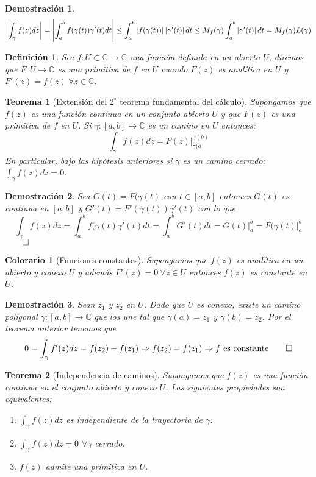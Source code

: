 \documentclass[10pt]{book}
\newtheorem{defi}{Definición}[chapter]
\newtheorem{theorem}{Teorema}[chapter]
\newtheorem*{dem}{Demostración}
\newtheorem{col}{Colorario}[chapter]
\newcommand{\C}{\mathbb{C}}
\newcommand{\f}{f: U\subset \C \longrightarrow \C}
\begin{document}
\begin{dem}
$$\left| \int_\gamma f(z)dz \right| = \left| \int_a^b f(\gamma(t))\gamma'(t)dt\right|\leq \int_a^b \left| f(\gamma(t))\right|\left| \gamma'(t)\right|dt\leq M_f(\gamma)\int_a^b\left| \gamma'(t)\right|dt =  M_f(\gamma)L(\gamma)$$
\end{dem}

\begin{defi}
Sea $\f$ una función definida en un abierto $U$, diremos que $F: U \longrightarrow\C$ es una primitiva de $f$ en $U$ cuando $F(z)$ es analítica en $U$ y $F'(z) = f(z) \ \forall z \in\C$.
\end{defi}

\begin{theorem}[Extensión del $2^\circ$ teorema fundamental del cálculo]
Supongamos que $f(z)$ es una función continua en un conjunto abierto $U$ y que $F(z)$ es una primitiva de $f$ en $U$. Si $\gamma:[a,b]\longrightarrow \C$ es un camino en $U$ entonces:
$$\int_\gamma f(z)dz = F(z)\bigg|_{\gamma(a}^{\gamma(b)}$$
En particular, bajo las hipótesis anteriores si $\gamma$ es un camino cerrado: $\int_\gamma f(z)dz = 0$.
\end{theorem}

\begin{dem}
Sea $G(t) = F(\gamma(t)$ con $t\in [a,b]$ entonces $G(t)$ es continua en $[a,b]$ y $G'(t) = F'(\gamma(t))\gamma'(t)$ con lo que
$$\int_\gamma f(z)dz = \int_a^b f(\gamma(t)\gamma'(t)dt = \int_a^b G'(t)dt = G(t)\bigg|_a^b = F(\gamma(t)\bigg |_a^b $$ $\qed$
\end{dem}

\begin{col}[Funciones constantes]
Supongamos que $f(z)$ es analítica en un abierto y conexo $U$ y además $F'(z)=0 \ \forall z \in U$ entonces $f(z)$ es constante en $U$.
\end{col}

\begin{dem}
Sean $z_1$ y $z_2$ en $U$. Dado que $U$ es conexo, existe un camino poligonal $\gamma:[a,b] \longrightarrow \C$ que los une tal que $\gamma(a) = z_1$ y $\gamma(b) = z_2$. Por el teorema anterior tenemos que
$$0 = \int_{\gamma} f'(z)dz = f(z_2)-f(z_1) \Rightarrow f(z_2)=f(z_1) \Rightarrow f \text{ es constante} \qed$$
\end{dem}


\begin{theorem}[Independencia de caminos]
Supongamos que $f(z)$ es una función continua en el conjunto abierto y conexo $U$. Las siguientes propiedades son equivalentes:
\begin{enumerate}
\item $\displaystyle\int_{\gamma}f(z)dz$ es independiente de la trayectoria de $\gamma$.
\item  $\displaystyle\int_{\gamma}f(z)dz = 0$ $\forall \gamma$ cerrado.
\item $f(z)$ admite una primitiva en $U$.
\end{enumerate}
\end{theorem}
\end{document}
